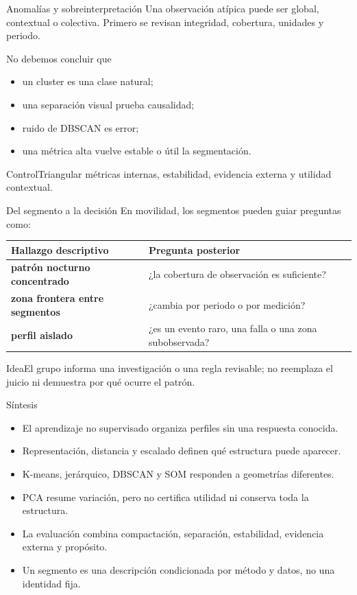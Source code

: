 \documentclass[aspectratio=169,10pt]{beamer}
\begin{document}
\begin{frame}{Anomalías y sobreinterpretación}
  \small
  Una observación atípica puede ser global, contextual o colectiva. Primero se revisan integridad, cobertura, unidades y periodo.
  \begin{alertblock}{No debemos concluir que}
    \begin{itemize}
      \item un cluster es una clase natural;
      \item una separación visual prueba causalidad;
      \item ruido de DBSCAN es error;
      \item una métrica alta vuelve estable o útil la segmentación.
    \end{itemize}
  \end{alertblock}
  \begin{block}{Control}Triangular métricas internas, estabilidad, evidencia externa y utilidad contextual.\end{block}
\end{frame}

\begin{frame}{Del segmento a la decisión}
  \small
  En movilidad, los segmentos pueden guiar preguntas como:
  \begin{tabularx}{\textwidth}{>{\bfseries}p{}X}\toprule
  Hallazgo descriptivo & Pregunta posterior\\\midrule
  patrón nocturno concentrado & ¿la cobertura de observación es suficiente?\\
  zona frontera entre segmentos & ¿cambia por periodo o por medición?\\
  perfil aislado & ¿es un evento raro, una falla o una zona subobservada?\\\bottomrule
  \end{tabularx}
  \begin{block}{Idea}El grupo informa una investigación o una regla revisable; no reemplaza el juicio ni demuestra por qué ocurre el patrón.\end{block}
\end{frame}

\begin{frame}{Síntesis}
  \small
  \begin{itemize}
    \item El aprendizaje no supervisado organiza perfiles sin una respuesta conocida.
    \item Representación, distancia y escalado definen qué estructura puede aparecer.
    \item K-means, jerárquico, DBSCAN y SOM responden a geometrías diferentes.
    \item PCA resume variación, pero no certifica utilidad ni conserva toda la estructura.
    \item La evaluación combina compactación, separación, estabilidad, evidencia externa y propósito.
    \item Un segmento es una descripción condicionada por método y datos, no una identidad fija.
  \end{itemize}
\end{frame}
\end{document}
